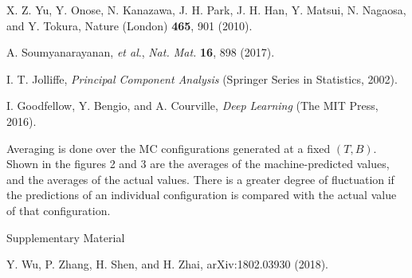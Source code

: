 \documentclass[reprint,amsmath,amssymb,aps,showpacs,superscriptaddress,prl]{revtex4-1}
\begin{document}
\begin{thebibliography}{99}
 X. Z. Yu, Y. Onose, N. Kanazawa, J. H. Park, J. H. Han, Y. Matsui, N. Nagaosa, and Y. Tokura, Nature (London) {\bf 465}, 901 (2010).

 A. Soumyanarayanan, {\it et al}., {\it Nat. Mat.} {\bf 16}, 898 (2017).

 I. T. Jolliffe, {\it Principal Component Analysis} (Springer Series in Statistics, 2002).

 I. Goodfellow, Y. Bengio, and A. Courville, {\it Deep Learning} (The MIT Press, 2016).

 Averaging is done over the MC configurations generated at a fixed $(T,B)$. Shown in the figures 2 and 3 are the averages of the machine-predicted values, and the averages of the actual values. There is a greater degree of fluctuation if the predictions of an individual configuration is compared with the actual value of that configuration.

 Supplementary Material

 Y. Wu, P. Zhang, H. Shen, and H. Zhai, arXiv:1802.03930 (2018).

\end{thebibliography}

%
%
\end{document}
